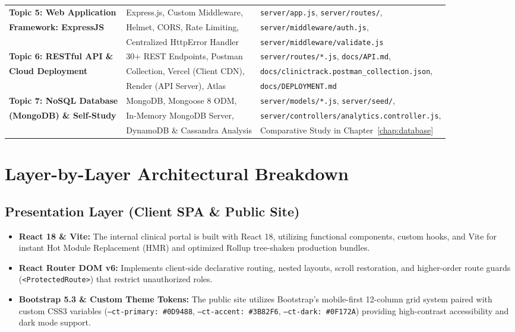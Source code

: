 \documentclass[12pt,a4paper,oneside]{report}
\begin{document}
\begin{table}[h!]
\begin{tabularx}{\textwidth}{l p{4.2cm} X}
\midrule
\textbf{Topic 5: Web Application} & Express.js, Custom Middleware, & \texttt{server/app.js}, \texttt{server/routes/}, \\
\textbf{Framework: ExpressJS} & Helmet, CORS, Rate Limiting, & \texttt{server/middleware/auth.js}, \\
& Centralized HttpError Handler & \texttt{server/middleware/validate.js} \\
\midrule
\textbf{Topic 6: RESTful API \&} & 30+ REST Endpoints, Postman & \texttt{server/routes/*.js}, \texttt{docs/API.md}, \\
\textbf{Cloud Deployment} & Collection, Vercel (Client CDN), & \texttt{docs/clinictrack.postman\_collection.json}, \\
& Render (API Server), Atlas & \texttt{docs/DEPLOYMENT.md} \\
\midrule
\textbf{Topic 7: NoSQL Database} & MongoDB, Mongoose 8 ODM, & \texttt{server/models/*.js}, \texttt{server/seed/}, \\
\textbf{(MongoDB) \& Self-Study} & In-Memory MongoDB Server, & \texttt{server/controllers/analytics.controller.js}, \\
& DynamoDB \& Cassandra Analysis & Comparative Study in Chapter~\ref{chap:database} \\
\bottomrule
\end{tabularx}
\end{table}

\section{Layer-by-Layer Architectural Breakdown}

\subsection{Presentation Layer (Client SPA \& Public Site)}
\begin{itemize}
    \item \textbf{React 18 \& Vite:} The internal clinical portal is built with React 18, utilizing functional components, custom hooks, and Vite for instant Hot Module Replacement (HMR) and optimized Rollup tree-shaken production bundles.
    \item \textbf{React Router DOM v6:} Implements client-side declarative routing, nested layouts, scroll restoration, and higher-order route guards (\texttt{<ProtectedRoute>}) that restrict unauthorized roles.
    \item \textbf{Bootstrap 5.3 \& Custom Theme Tokens:} The public site utilizes Bootstrap's mobile-first 12-column grid system paired with custom CSS3 variables (\texttt{--ct-primary: \#0D9488}, \texttt{--ct-accent: \#3B82F6}, \texttt{--ct-dark: \#0F172A}) providing high-contrast accessibility and dark mode support.
\end{itemize}
\end{document}
